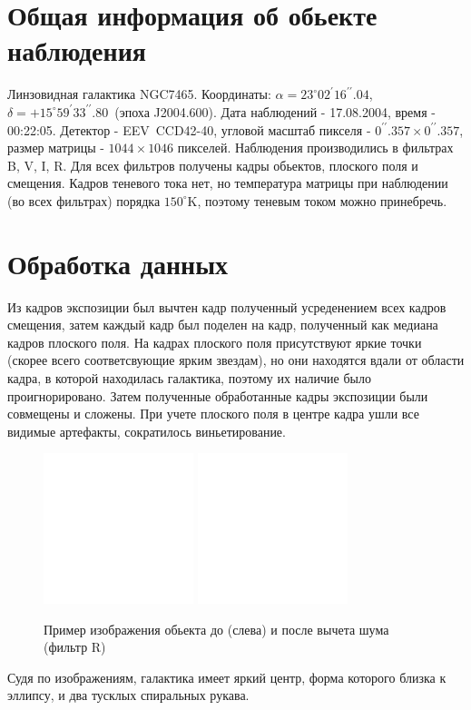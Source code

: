 \documentclass [12pt, a4paper] {article}
\theoremstyle{definition}
\begin{document}
	\section{Общая информация об обьекте наблюдения}
	Линзовидная галактика NGC7465. Координаты: $\alpha=23^{\circ} 02^{\prime} 16^{\prime \prime}.04$, $\delta = +15^{\circ}59^{\prime}33^{\prime \prime}.80$~(эпоха J2004.600). Дата наблюдений - 17.08.2004, время - 00:22:05. Детектор - EEV~CCD42-40, угловой масштаб пикселя - $0^{\prime \prime}.357\times0^{\prime \prime}.357$, размер матрицы - $1044\times1046$ пикселей. Наблюдения производились в фильтрах B, V, I, R. Для всех фильтров получены кадры обьектов, плоского поля и смещения. Кадров теневого тока нет, но температура матрицы при наблюдении (во всех фильтрах) порядка $150^\circ$K, поэтому теневым током можно принебречь.
	\section{Обработка данных}
	Из кадров экспозиции был вычтен кадр полученный усреденением всех кадров смещения, затем каждый кадр был поделен на кадр, полученный как медиана кадров плоского поля. На кадрах плоского поля присутствуют яркие точки (скорее всего соответсвующие ярким звездам), но они находятся вдали от области кадра, в которой находилась галактика, поэтому их наличие было проигнорировано. Затем полученные обработанные кадры экспозиции были совмещены и сложены. 
	При учете плоского поля в центре кадра ушли все видимые артефакты, сократилось виньетирование. 
	\begin{figure}[!b] 
	\centering
			\includegraphics[width = 0.39\textwidth]{result.png}
			\includegraphics[width = 0.39\textwidth]{result_w_noize.png}
			\caption{Пример изображения обьекта до (слева) и после вычета шума (фильтр R) }
	\end{figure}
	\par Судя по изображениям, галактика имеет яркий центр, форма которого близка к эллипсу, и два тусклых спиральных рукава.
\end{document}
